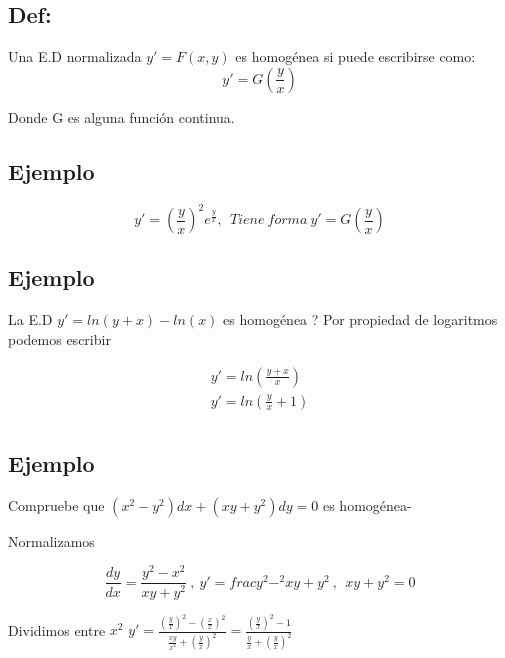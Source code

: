 \documentclass{article}
\begin{document}
\subsection{Def:}

Una E.D normalizada $y' = F(x,y)$ es homogénea si puede escribirse como: \\

\begin{equation}
\nonumber y' = G \left( \frac{y}{x} \right)
\end{equation}

Donde G es alguna función continua.

\subsection{Ejemplo}

\begin{equation}
y'  = \left( \frac{y}{x} \right)^2 e^{\frac{y}{x}}, \ \ Tiene \ forma \  y' = G \left( \frac{y}{x} \right)
\end{equation}

\subsection{Ejemplo}

La E.D $y' =ln (y+x) - ln(x) $ es homogénea ?
Por propiedad de logaritmos podemos escribir

\begin{eqnarray}
 \nonumber y' = ln \left( \frac{y+x}{x} \right) \\
 \nonumber y' = ln \left( \frac{y}{x} + 1 \right)\\
\end{eqnarray}

\subsection{Ejemplo}
Compruebe que $\left( x^2 - y^2 \right)dx+\left(xy+y^2\right)dy = 0$ es homogénea-


Normalizamos 


\begin{equation}
\frac{dy}{dx} = \frac{y^2-x^2}{xy+y^2} \  , \ y' = frac{y^2-^2}{xy+y^2} \ , \ \ xy+y^2 = 0
\end{equation}

Dividimos entre $x^2$  $y' = \frac{\left(\frac{y}{x} \right)^2 - \left( \frac{x}{x} \right)^2 }{\frac{xy}{x^2} + \left( \frac{y}{x} \right)^2} = \frac{\left( \frac{y}{x} \right)^2 -1}{\frac{y}{x}+ \left( \frac{y}{x} \right)^2}$
\end{document}
